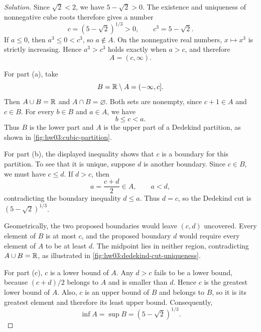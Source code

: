 \begin{proof}[Solution]
  Since $\sqrt{2}<2$, we have $5-\sqrt{2}>0$. The existence and
  uniqueness of nonnegative cube roots therefore gives a number
  \[
    c=(5-\sqrt{2})^{1/3}>0,\qquad c^3=5-\sqrt{2}.
  \]
  If $a\leq0$, then $a^3\leq0<c^3$, so $a\notin A$. On the
  nonnegative real numbers, $x \mapsto x^3$ is strictly increasing. Hence
  $a^3>c^3$ holds exactly when $a>c$, and therefore
  \[
    A=(c,\infty).
  \]

  For part (a), take
  \[
    B=\mathbb{R}\setminus A=(-\infty,c].
  \]
  Then $A\cup B=\R$ and $A\cap B=\varnothing$. Both sets are
  nonempty, since $c+1\in A$ and $c\in B$. For every $b\in B$ and
  $a\in A$, we have
  \[
    b\leq c<a.
  \]
  Thus $B$ is the lower part and $A$ is the upper part of a Dedekind
  partition, as shown in \autoref{fig:hw03:cubic-partition}.
  \begin{marginfigure}
    \centering
    
    \caption[A cubic Dedekind partition.]{Schematic partition with
      the boundary included in $B$ and excluded from $A$.
      The two intervals together cover the real line.}
    \label{fig:hw03:cubic-partition}
  \end{marginfigure}

  For part (b), the displayed inequality shows that $c$ is a boundary
  for this partition. To see that it is unique, suppose $d$ is another
  boundary. Since $c\in B$, we must have $c\leq d$. If $d>c$, then
  \[
    a=\frac{c+d}{2}\in A,\qquad a<d,
  \]
  contradicting the boundary inequality $d\leq a$. Thus $d=c$, so
  the Dedekind cut is $(5-\sqrt{2})^{1/3}$.

  Geometrically, the two proposed boundaries would leave $(c,d)$
  uncovered. Every element of $B$ is at most $c$, and the proposed
  boundary $d$ would require every element of $A$ to be at least $d$.
  The midpoint lies in neither region, contradicting $A\cup B=\R$,
  as illustrated in \autoref{fig:hw03:dedekind-cut-uniqueness}.
  \begin{marginfigure}
    \centering
    
    \caption[Uniqueness of a Dedekind cut.]{Schematic regions allowed by
      two proposed boundaries $c<d$. They force
      $B\subseteq(-\infty,c]$ and $A\subseteq[d,\infty)$.
      Their gap contains $(c+d)/2$, contradicting $A\cup B=\R$.}
    \label{fig:hw03:dedekind-cut-uniqueness}
  \end{marginfigure}

  For part (c), $c$ is a lower bound of $A$. Any $d>c$ fails to be a
  lower bound, because $(c+d)/2$ belongs to $A$ and is smaller than
  $d$. Hence $c$ is the greatest lower bound of $A$. Also, $c$ is an
  upper bound of $B$ and belongs to $B$, so it is its greatest element
  and therefore its least upper bound. Consequently,
  \[
    \inf A=\sup B=(5-\sqrt{2})^{1/3}.
  \]
\end{proof}
